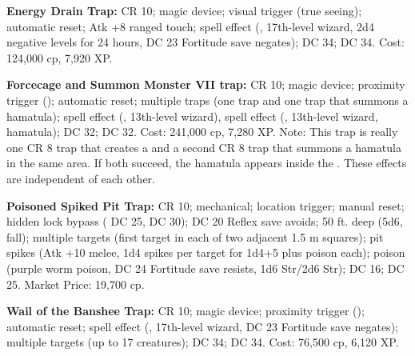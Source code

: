 \textbf{Energy Drain Trap:} CR 10; magic device; visual trigger (true seeing); automatic reset; Atk +8 ranged touch; spell effect (, 17th-level wizard, 2d4 negative levels for 24 hours, DC 23 Fortitude save negates);  DC 34;  DC 34. Cost: 124,000 cp, 7,920 XP.

\textbf{Forcecage and Summon Monster VII trap:} CR 10; magic device; proximity trigger (); automatic reset; multiple traps (one  trap and one  trap that summons a hamatula); spell effect (, 13th-level wizard), spell effect (, 13th-level wizard, hamatula);  DC 32;  DC 32. Cost: 241,000 cp, 7,280 XP. Note: This trap is really one CR 8 trap that creates a  and a second CR 8 trap that summons a hamatula in the same area. If both succeed, the hamatula appears inside the . These effects are independent of each other.

\textbf{Poisoned Spiked Pit Trap:} CR 10; mechanical; location trigger; manual reset; hidden lock bypass ( DC 25,  DC 30); DC 20 Reflex save avoids; 50 ft. deep (5d6, fall); multiple targets (first target in each of two adjacent 1.5 m squares); pit spikes (Atk +10 melee, 1d4 spikes per target for 1d4+5 plus poison each); poison (purple worm poison, DC 24 Fortitude save resists, 1d6 Str/2d6 Str);  DC 16;  DC 25. Market Price: 19,700 cp.

\textbf{Wail of the Banshee Trap:} CR 10; magic device; proximity trigger (); automatic reset; spell effect (, 17th-level wizard, DC 23 Fortitude save negates); multiple targets (up to 17 creatures);  DC 34;  DC 34. Cost: 76,500 cp, 6,120 XP.
